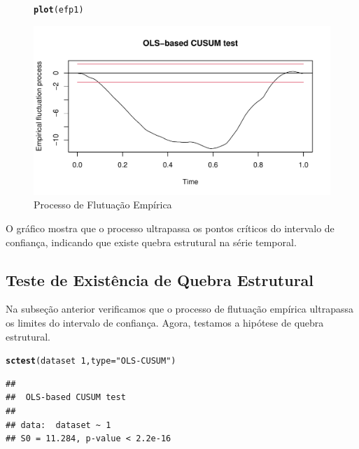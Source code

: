 \documentclass{article}\usepackage[]{graphicx}\usepackage[]{color}
\makeatletter
\def\maxwidth{ %
  \ifdim\Gin@nat@width>\linewidth
    \linewidth
  \else
    \Gin@nat@width
  \fi
}
\newcommand{\hlnum}[1]{\textcolor[rgb]{0.686,0.059,0.569}{#1}}%
\newcommand{\hlstr}[1]{\textcolor[rgb]{0.192,0.494,0.8}{#1}}%
\newcommand{\hlopt}[1]{\textcolor[rgb]{0,0,0}{#1}}%
\newcommand{\hlstd}[1]{\textcolor[rgb]{0.345,0.345,0.345}{#1}}%
\newcommand{\hlkwc}[1]{\textcolor[rgb]{0.333,0.667,0.333}{#1}}%
\newcommand{\hlkwd}[1]{\textcolor[rgb]{0.737,0.353,0.396}{\textbf{#1}}}%
\newenvironment{kframe}{%
 \def\at@end@of@kframe{}%
 \ifinner\ifhmode%
  \def\at@end@of@kframe{\end{minipage}}%
  \begin{minipage}{\columnwidth}%
 \fi\fi%
 \def\FrameCommand##1{\hskip\@totalleftmargin \hskip-\fboxsep
 \colorbox{shadecolor}{##1}\hskip-\fboxsep
     \hskip-\linewidth \hskip-\@totalleftmargin \hskip\columnwidth}%
 \MakeFramed {\advance\hsize-\width
   \@totalleftmargin\z@ \linewidth\hsize
   \@setminipage}}%
 {\par\unskip\endMakeFramed%
 \at@end@of@kframe}
\newenvironment{knitrout}{}{} %
\makeatother
\begin{document}
        \begin{figure}[H]
        \caption{Processo de Flutuação Empírica}
        \centering
\begin{knitrout}
\color{fgcolor}\begin{kframe}
\begin{alltt}
\hlkwd{plot}\hlstd{(efp1)}
\end{alltt}
\end{kframe}
\includegraphics[width=\maxwidth]{figure/unnamed-chunk-24-1} 

\end{knitrout}
        \end{figure}
        
        O gráfico mostra que o processo ultrapassa os pontos críticos do intervalo de confiança, indicando que existe quebra estrutural na série temporal.

    \subsection{Teste de Existência de Quebra Estrutural}
    
        Na subseção anterior verificamos que o processo de flutuação empírica ultrapassa os limites do intervalo de confiança. Agora, testamos a hipótese de quebra estrutural.
    
\begin{knitrout}
\color{fgcolor}\begin{kframe}
\begin{alltt}
\hlkwd{sctest}\hlstd{(dataset}\hlopt{~}\hlnum{1}\hlstd{,} \hlkwc{type}\hlstd{=}\hlstr{"OLS-CUSUM"}\hlstd{)}
\end{alltt}
\begin{verbatim}
## 
## 	OLS-based CUSUM test
## 
## data:  dataset ~ 1
## S0 = 11.284, p-value < 2.2e-16
\end{verbatim}
\end{kframe}
\end{knitrout}
\end{document}
